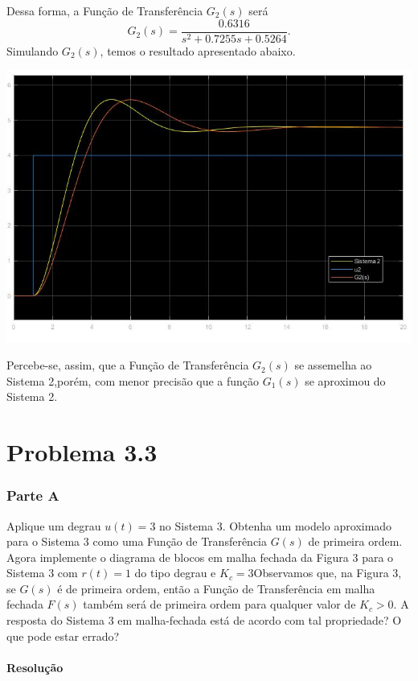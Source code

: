 \documentclass[
]{book}
\theoremstyle{definition}
\theoremstyle{definition}
\theoremstyle{definition}
\theoremstyle{remark}
\begin{document}
Dessa forma, a Função de Transferência \(G_2(s)\) será
\[
G_2(s) = \frac {0.6316}{s^2 + 0.7255s + 0.5264}.
\]
Simulando \(G_2(s)\), temos o resultado apresentado abaixo.

\includegraphics{Imagens/Lab3/Resolução/prob2B.jpg}

Percebe-se, assim, que a Função de Transferência \(G_2(s)\) se assemelha ao Sistema 2,porém, com menor precisão que a função \(G_1(s)\) se aproximou do Sistema 2.

\hypertarget{problema-3.3}{%
\section*{Problema 3.3}\label{problema-3.3}}

\hypertarget{parte-a}{%
\subsubsection*{Parte A}\label{parte-a}}

Aplique um degrau \(u(t) = 3\) no Sistema 3. Obtenha um modelo aproximado para o Sistema 3 como uma Função de Transferência \(G(s)\) de primeira ordem. Agora implemente o diagrama de blocos em malha fechada da Figura 3 para o Sistema 3 com \(r(t) = 1\) do tipo degrau e \(K_c = 3\)Observamos que, na Figura 3, se \(G(s)\) é de primeira ordem, então a Função de Transferência em malha fechada \(F(s)\) também será de primeira ordem para qualquer valor de \(K_c > 0\). A resposta do Sistema 3 em malha-fechada está de acordo com tal propriedade? O que pode estar errado?

\hypertarget{resoluuxe7uxe3o-8}{%
\paragraph{Resolução}\label{resoluuxe7uxe3o-8}}
\end{document}
